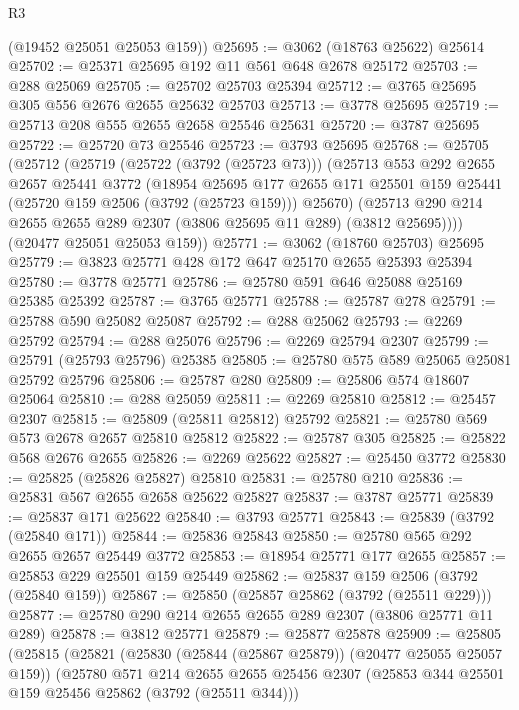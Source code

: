 \begin{lexlean}{R3}
\begin{coremodule}
      (@19452 @25051 @25053 @159))
@25695 := @3062 (@18763 @25622) @25614
@25702 := @25371 @25695 @192 @11 @561 @648 @2678 @25172
@25703 := @288 @25069
@25705 := @25702 @25703 @25394
@25712 := @3765 @25695 @305 @556 @2676 @2655 @25632 @25703
@25713 := @3778 @25695
@25719 := @25713 @208 @555 @2655 @2658 @25546 @25631
@25720 := @3787 @25695
@25722 := @25720 @73 @25546
@25723 := @3793 @25695
@25768 := @25705
    (@25712
      (@25719
        (@25722 (@3792 (@25723 @73)))
        (@25713
          @553
          @292
          @2655
          @2657
          @25441
          @3772
          (@18954
            @25695
            @177
            @2655
            @171
            @25501
            @159
            @25441
            (@25720 @159 @2506 (@3792 (@25723 @159)))
            @25670)
          (@25713 @290 @214 @2655 @2655 @289 @2307 (@3806 @25695 @11 @289) (@3812 @25695))))
      (@20477 @25051 @25053 @159))
@25771 := @3062 (@18760 @25703) @25695
@25779 := @3823 @25771 @428 @172 @647 @25170 @2655 @25393 @25394
@25780 := @3778 @25771
@25786 := @25780 @591 @646 @25088 @25169 @25385 @25392
@25787 := @3765 @25771
@25788 := @25787 @278
@25791 := @25788 @590 @25082 @25087
@25792 := @288 @25062
@25793 := @2269 @25792
@25794 := @288 @25076
@25796 := @2269 @25794 @2307
@25799 := @25791 (@25793 @25796) @25385
@25805 := @25780 @575 @589 @25065 @25081 @25792 @25796
@25806 := @25787 @280
@25809 := @25806 @574 @18607 @25064
@25810 := @288 @25059
@25811 := @2269 @25810
@25812 := @25457 @2307
@25815 := @25809 (@25811 @25812) @25792
@25821 := @25780 @569 @573 @2678 @2657 @25810 @25812
@25822 := @25787 @305
@25825 := @25822 @568 @2676 @2655
@25826 := @2269 @25622
@25827 := @25450 @3772
@25830 := @25825 (@25826 @25827) @25810
@25831 := @25780 @210
@25836 := @25831 @567 @2655 @2658 @25622 @25827
@25837 := @3787 @25771
@25839 := @25837 @171 @25622
@25840 := @3793 @25771
@25843 := @25839 (@3792 (@25840 @171))
@25844 := @25836 @25843
@25850 := @25780 @565 @292 @2655 @2657 @25449 @3772
@25853 := @18954 @25771 @177 @2655
@25857 := @25853 @229 @25501 @159 @25449
@25862 := @25837 @159 @2506 (@3792 (@25840 @159))
@25867 := @25850 (@25857 @25862 (@3792 (@25511 @229)))
@25877 := @25780 @290 @214 @2655 @2655 @289 @2307 (@3806 @25771 @11 @289)
@25878 := @3812 @25771
@25879 := @25877 @25878
@25909 := @25805
    (@25815
      (@25821
        (@25830 (@25844 (@25867 @25879)) (@20477 @25055 @25057 @159))
        (@25780
          @571
          @214
          @2655
          @2655
          @25456
          @2307
          (@25853 @344 @25501 @159 @25456 @25862 (@3792 (@25511 @344)))

\end{coremodule}
\end{lexlean}
